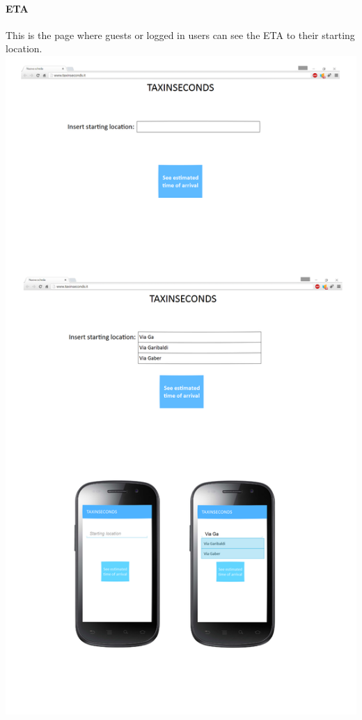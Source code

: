 \documentclass{article}
\begin{document}
\paragraph{ETA}
This is the page where guests or logged in users can see the ETA to their starting location.
\includegraphics{ETA interface}
\clearpage
\end{document}
